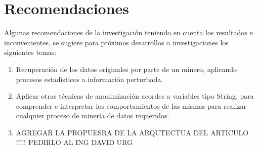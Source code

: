 \documentclass[a4paper,openright,12pt]{book}
\theoremstyle{definition}
\theoremstyle{remark}
\begin{document}
\section{Recomendaciones}
Algunas recomendaciones de la investigación teniendo en cuenta los resultados e inconvenientes, se sugiere para próximos desarrollos o investigaciones los siguientes temas:
\begin{enumerate}
	\item Recuperación de los datos originales por parte de un minero, aplicando procesos estadísticos a información perturbada.
    \item Aplicar otras técnicas de anonimización acordes a variables tipo String, para comprender e interpretar los comportamientos de las mismas para realizar cualquier proceso de minería de datos requeridos.
    \item AGREGAR LA PROPUESRA DE LA ARQUTECTUA DEL ARTICULO !!!!! PEDIRLO AL ING DAVID URG
\end{enumerate}
\clearpage
\end{document}
